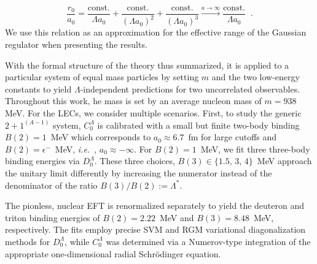 \documentclass[preprint,12pt]{elsarticle}
\newcommand{\abb}{\ensuremath{2\!+\!1^{(A-1)}}}
\newcommand{\ie}{\textit{i.e.}~}
\begin{document}
\begin{equation}
    \frac{r_0}{a_0} = \frac{\text{const.}}{\Lambda a_0}+ \frac{\text{const.}}{(\Lambda a_0)^2}+ 
    \frac{\text{const.}}{(\Lambda a_0)^3} \xrightarrow[]{a\rightarrow\infty} \frac{\text{const.}}{\Lambda a_0}\;\;.
    \label{eq:philips_effr}
\end{equation}
We use this relation as an approximation for the effective range of the Gaussian regulator when presenting
the results.


With the formal structure of the theory thus summarized, it is applied to a particular system of equal mass particles
by setting $m$ and the two low-energy constants to yield $\Lambda$-independent predictions for two uncorrelated
observables. Throughout this work, he mass is set by an average nucleon mass of $m=938~$MeV. For the LECs,
we consider multiple scenarios. First, to study the generic $\abb$ system, $C_0^\Lambda$ is calibrated with a small but 
finite two-body binding $B(2)=1$~MeV which corresponds to $a_0\approx6.7$~fm for large cutoffs and 
$B(2)=\epsilon^-$~MeV, \ie, $a_0\approx-\infty$. For $B(2)=1$~MeV,
we fit three three-body binding energies via $D_0^\Lambda$. These three choices, $B(3)\in\lbrace1.5,\,3,\,4\rbrace$~MeV
approach the unitary limit differently by increasing the numerator instead of the denominator of the
ratio $B(3)/B(2):=\Lambda^*$.

The pionless, nuclear EFT is renormalized separately to yield the deuteron and triton binding energies of $B(2)=2.22$~MeV
and $B(3)=8.48$~MeV, respectively. 
The fits employ precise SVM and RGM variational diagonalization methods for $D_0^\Lambda$, while $C_0^\Lambda$ was
determined via a Numerov-type integration of the appropriate one-dimensional radial Schr\"odinger equation.
\end{document}

